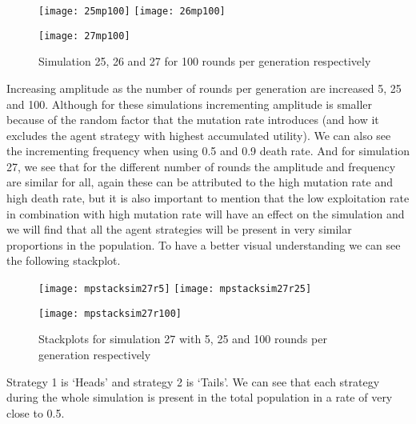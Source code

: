 \documentclass{book}
\begin{document}
\begin{figure}[H]       
    \begin{center}
    \mbox{\texttt{[image: 25mp100]}}   
    \hspace{0px}
    \mbox{\texttt{[image: 26mp100]}}
    \hspace{40px}
    \end{center}
    \begin{center}
    \mbox{\texttt{[image: 27mp100]}}
    \end{center}
    \caption{Simulation 25, 26 and 27 for 100 rounds per generation respectively}
    \label{simulation252627mp100}
\end{figure}
Increasing amplitude as the number of rounds per generation are increased 5, 25 and 100. Although for these simulations incrementing amplitude is smaller because of the random factor that the mutation rate introduces (and how it excludes the agent strategy with highest accumulated utility). We can also see the incrementing frequency when using 0.5 and 0.9 death rate. And for simulation 27, we see that for the different number of rounds the amplitude and frequency are similar for all, again these  can be attributed to the high mutation rate and high death rate, but it is also important to mention that the low exploitation rate in combination with high mutation rate will have an effect on the simulation and we will find that all the agent strategies will be present in very similar proportions in the population. To have a better visual understanding we can see the following stackplot.  

\begin{figure}[H]       
    \begin{center}
    \mbox{\texttt{[image: mpstacksim27r5]}}   
    \hspace{0px}
    \mbox{\texttt{[image: mpstacksim27r25]}}
    \hspace{40px}
    \end{center}
    \begin{center}
    \mbox{\texttt{[image: mpstacksim27r100]}}
    \end{center}
    \caption{Stackplots for simulation 27 with 5, 25 and 100 rounds per generation respectively}
    \label{simulation27mp525100}

\end{figure}

Strategy 1 is `Heads' and strategy 2 is `Tails'. We can see that each strategy during the whole simulation is present in the total population in a rate of  very close to 0.5. 
\end{document}
